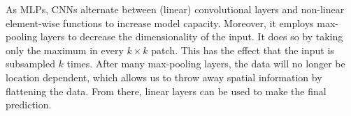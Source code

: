 As MLPs, CNNs alternate between (linear) convolutional layers and non-linear element-wise functions
to increase model capacity. Moreover, it employs max-pooling layers to decrease the dimensionality
of the input. It does so by taking only the maximum in every $k \times k$ patch. This has the
effect that the input is subsampled $k$ times. After many max-pooling layers, the data will no
longer be location dependent, which allows us to throw away spatial information by flattening the
data. From there, linear layers can be used to make the final prediction.

